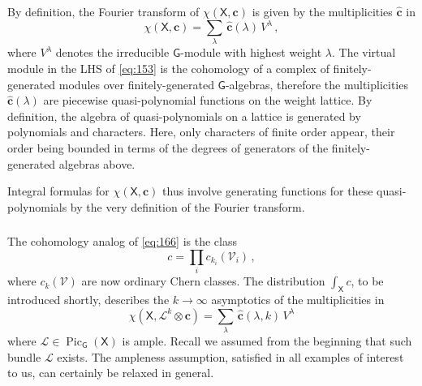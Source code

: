 \documentclass[14pt]{extarticle}
\newcommand{\C}{\mathbb{C}}
\newcommand{\bG}{\mathsf{G}}
\newcommand{\bX}{\mathsf{X}}
\newcommand{\cL}{\mathscr{L}}
\newcommand{\cV}{\mathscr{V}}
\newcommand{\bpsi}{\boldsymbol{\psi}}
\newcommand{\bbch}{\widehat{\bbc}}
\newcommand{\bbc}{\mathbf{c}}
\DeclareMathOperator{\Pic}{Pic}
\theoremstyle{definition}
\begin{document}
By definition, the Fourier transform of $\chi(\bX, \bbc)$ is given by the
multiplicities $\bbch$ in
%
\begin{equation}
  \label{eq:153}
\chi(\bX, \bbc)  = \sum_{\lambda} \,
  \bbch(\lambda) 
 \, 
  V^\lambda \,, 
\end{equation}
%
where $V^\lambda$ denotes the irreducible $\bG$-module with highest
weight $\lambda$. 
%
%
%
%
%
The virtual module in the LHS of \eqref{eq:153}
is the cohomology of a complex of finitely-generated
modules over finitely-generated
$\bG$-algebras, therefore the multiplicities $\bbch(\lambda)$ are
piecewise quasi-polynomial functions on the weight lattice.
By definition, the algebra of quasi-polynomials on a lattice is
generated by polynomials and characters. Here, only characters
of finite order appear, their order being bounded in terms of the degrees of
generators of the finitely-generated algebras above.


Integral
formulas for $\chi(\bX, \bbc)$ thus involve generating functions for these
quasi-polynomials
by the very definition of the Fourier transform. 

\subsubsection{}

The cohomology analog of \eqref{eq:166} is the class
%
\begin{equation}
  \label{eq:176}
  c= \prod_i c_{k_i} (\cV_i)\,, 
\end{equation}
%
where $c_k(\cV)$ are now ordinary Chern classes. The distribution
$\int_\bX c$, to be introduced shortly,
describes the $k\to \infty$ asymptotics
of the multiplicities in 
%
\begin{equation}
  \label{eq:155}
  \chi(\bX,\cL^k \otimes \bbc) = \sum_{\lambda} \,
  \bbch(\lambda,k) 
 \, 
  V^\lambda 
\end{equation}
%
where $\cL\in \Pic_\bG(\bX)$ is ample. Recall we assumed from the
beginning that such bundle $\cL$ exists. The ampleness assumption,
satisfied in all examples of interest to us, can
certainly be relaxed in general.
\end{document}
